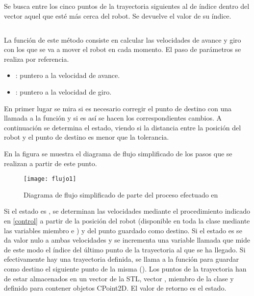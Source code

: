 \noindent
Se busca entre los cinco puntos de la trayectoria siguientes al de índice  dentro del vector  aquel que esté más cerca del robot. Se devuelve el valor de su índice.

\subsection{}

\noindent
{}

\noindent
La función de este método consiste en calcular las velocidades de avance y giro con los que se va a mover el robot en cada momento. El paso de parámetros se realiza por referencia.

\begin{itemize}
  \item {}: puntero a la velocidad de avance.
  \item {}: puntero a la velocidad de giro.
\end{itemize}

\noindent
En primer lugar se mira si es necesario corregir el punto de destino con una llamada a la función  y si es así se hacen los correspondientes cambios. A continuación se determina el estado, viendo si la distancia entre la posición del robot y el punto de destino es menor que la tolerancia.

En la figura se muestra el diagrama de flujo simplificado de los pasos que se realizan a partir de este punto.

\begin{figure}[h]
  \centering\texttt{[image: flujo1]}\\
  \caption{Diagrama de flujo simplificado de parte del proceso efectuado en }\label{fg:flujo1}
\end{figure}
Si el estado es , se determinan las velocidades mediante el procedimiento indicado en \ref{control} a partir de la posición del robot (disponible en toda la clase mediante las variables miembro  e ) y del punto guardado como destino.
Si el estado es  se da valor nulo a ambas velocidades y se incrementa una variable llamada  que mide de este modo el índice del último punto de la trayectoria al que se ha llegado. Si efectivamente hay una trayectoria definida, se llama a la función  para guardar como destino el siguiente punto de la misma (). Los puntos de la trayectoria han de estar almacenados en un vector de la STL, vector , miembro de la clase y definido para contener objetos CPoint2D.
\noindent
El valor de retorno es el estado.

